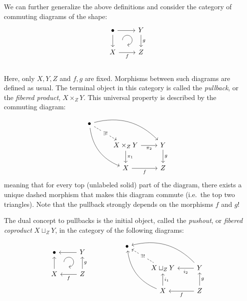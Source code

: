 \documentclass[english,letterpaper]{article}%
\numberwithin{equation}{section}
\numberwithin{figure}{section}
\numberwithin{table}{section}
\theoremstyle{definition}
\theoremstyle{definition}
\theoremstyle{definition}
\theoremstyle{plain}
\theoremstyle{plain}
\theoremstyle{plain}
\theoremstyle{plain}
\theoremstyle{remark}
\theoremstyle{remark}
\begin{document}
%
\begin{defn}[Pullbacks]\label{pullbacks}
We can further generalize the above definitions and consider the
category of commuting diagrams of the shape: \[\begin{tikzcd}[every matrix/.append style={name=m},   
execute at end picture={\draw [<-] ([xshift=-7mm,yshift=1mm]m-2-2.north) arc[start angle=-90,delta angle=270,radius=0.25cm];}]
   \bullet \arrow[r]\arrow[d]& Y\arrow[d,"g"] \\
   X\arrow[r,swap,"f"]& Z\\
\end{tikzcd}\]
Here, only $X,Y,Z$ and $f,g$ are fixed. Morphisms between such diagrams
are defined as usual. The terminal object in this category is called
the \emph{pullback}, or the \emph{fibered product}, $X\times_{Z}Y$.
This universal property is described by the commuting diagram:\[\begin{tikzcd}
  \bullet   \arrow[drr, bend left]   \arrow[ddr, bend right]   \arrow[dr, dashed,"\exists!" description] & & \\
    & X \times_Z Y \arrow[r,swap, "\pi_2"] \arrow[d, "\pi_1"]       & Y \arrow[d, "g"] \\ & X \arrow[r,swap, "f"] &Z 
\end{tikzcd}\]meaning that for every top (unlabeled solid) part of the diagram,
there exists a unique dashed morphism that makes this diagram commute
(i.e.\ the top two triangles). Note that the pullback strongly depends
on the morphisms $f$ and $g$!
\end{defn}
%
\begin{defn}[Pushouts]\label{pushouts}
The dual concept to pullbacks is the initial object, called the \emph{pushout}, or \emph{fibered coproduct} $X\sqcup_{Z}Y$, in the category of the following diagrams:
\[\begin{tikzcd}[every matrix/.append style={name=m},   
execute at end picture={\draw [<-] ([xshift=-7mm,yshift=1mm]m-2-2.north) arc[start angle=-90,delta angle=270,radius=0.25cm];}]
   \bullet \arrow[r,leftarrow]\arrow[d,leftarrow]& Y\arrow[d,leftarrow,"g"] \\
   X\arrow[r,,leftarrow,swap,"f"]& Z\\
\end{tikzcd}\quad\quad\quad\quad\quad
\begin{tikzcd}
  \bullet   \arrow[drr,leftarrow, bend left]   \arrow[ddr,leftarrow, bend right]   \arrow[dr,leftarrow, dashed,"\exists!" description] & & \\
    & X \sqcup_Z Y \arrow[r,leftarrow,swap, "i_2"] \arrow[d,leftarrow, "i_1"]       & Y \arrow[d,leftarrow, "g"] \\ & X \arrow[r,leftarrow,swap, "f"] &Z 
\end{tikzcd}
\]
\end{defn}
\end{document}
